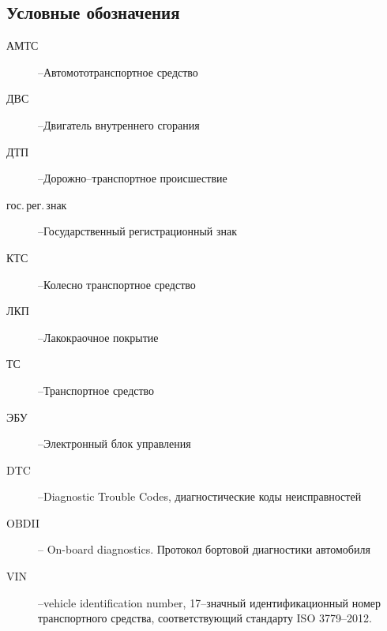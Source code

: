 \subsection{Условные обозначения}
\begin{description}
%	 
\item[АМТС] --Автомототранспортное средство
\item[ДВС] --Двигатель внутреннего сгорания
\item[ДТП] --Дорожно--транспортное происшествие
\item[гос.\,рег.\,знак] --Государственный регистрационный знак
\item[КТС] --Колесно транспортное средство 
\item[ЛКП] --Лакокраочное покрытие
\item[ТС] --Транспортное средство
\item[ЭБУ] --Электронный блок управления
\item[DTC] --Diagnostic Trouble Codes, диагностические коды неисправностей
\item[OBDII] -- On-board diagnostics. Протокол бортовой диагностики автомобиля
\item[VIN] --vehicle identification number, 17--значный идентификационный номер транспортного средства, соответствующий стандарту ISO 3779--2012.
%
\end{description}
